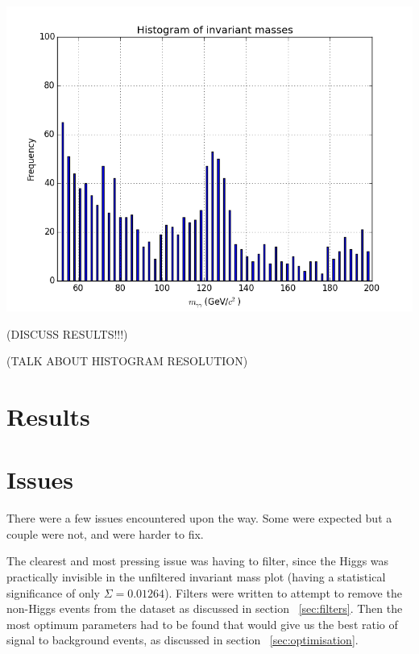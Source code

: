 \documentclass[11pt]{amsart}
\newenvironment{Figure}
  {\par\medskip\noindent\minipage{\linewidth}}
  {\endminipage\par\medskip}
\begin{document}
\begin{multicols}{2}
\begin{Figure}
  \centering
  \includegraphics[width=\linewidth]{invmass2}
  \label{fig:invmass}
\end{Figure}

(DISCUSS RESULTS!!!)

(TALK ABOUT HISTOGRAM RESOLUTION)

\section{Results}

\section{Issues}

There were a few issues encountered upon the way. Some were expected but a couple were not, and were harder to fix.

The clearest and most pressing issue was having to filter, since the Higgs was practically invisible in the unfiltered invariant mass plot (having a statistical significance of only $\Sigma = 0.01264$). Filters were written to attempt to remove the non-Higgs events from the dataset as discussed in section ~\ref{sec:filters}. Then the most optimum parameters had to be found that would give us the best ratio of signal to background events, as discussed in section ~\ref{sec:optimisation}.


\end{multicols}
\end{document}
